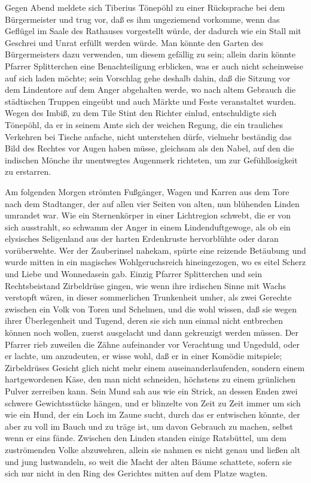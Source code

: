 Gegen Abend meldete sich Tiberius Tönepöhl zu einer Rücksprache bei
dem Bürgermeister und trug vor, daß es ihm ungeziemend vorkomme,
wenn das Geflügel im Saale des Rathauses vorgestellt würde, der
dadurch wie ein Stall mit Geschrei und Unrat erfüllt werden würde.
Man könnte den Garten des Bürgermeisters dazu verwenden, um diesem
gefällig zu sein; allein darin könnte Pfarrer Splitterchen eine
Benachteiligung erblicken, was er auch nicht scheinweise auf sich
laden möchte; sein Vorschlag gehe deshalb dahin, daß die Sitzung
vor dem Lindentore auf dem Anger abgehalten werde, wo nach altem
Gebrauch die städtischen Truppen eingeübt und auch Märkte und Feste
veranstaltet wurden. Wegen des Imbiß, zu dem Tile Stint den Richter
einlud, entschuldigte sich Tönepöhl, da er in seinem Amte sich der
weichen Regung, die ein trauliches Verkehren bei Tische anfache,
nicht unterstehen dürfe, vielmehr beständig das Bild des Rechtes
vor Augen haben müsse, gleichsam als den Nabel, auf den die
indischen Mönche ihr unentwegtes Augenmerk richteten, um zur
Gefühllosigkeit zu erstarren.

Am folgenden Morgen strömten Fußgänger, Wagen und Karren aus dem
Tore nach dem Stadtanger, der auf allen vier Seiten von alten, nun
blühenden Linden umrandet \pagenum{[44]} war. Wie ein Sternenkörper
in einer Lichtregion schwebt, die er von sich ausstrahlt, so
schwamm der Anger in einem Lindenduftgewoge, als ob ein elysisches
Seligenland aus der harten Erdenkruste hervorblühte oder daran
vorüberwehte. Wer der Zauberinsel nahekam, spürte eine reizende
Betäubung und wurde mitten in ein magisches Wohlgeruchsreich
hineingezogen, wo es eitel Scherz und Liebe und Wonnedasein gab.
Einzig Pfarrer Splitterchen und sein Rechtsbeistand Zirbeldrüse
gingen, wie wenn ihre irdischen Sinne mit Wachs verstopft wären, in
dieser sommerlichen Trunkenheit umher, als zwei Gerechte zwischen
ein Volk von Toren und Schelmen, und die wohl wissen, daß sie wegen
ihrer Überlegenheit und Tugend, deren sie sich nun einmal nicht
entbrechen können noch wollen, zuerst ausgelacht und dann
gekreuzigt werden müssen. Der Pfarrer rieb zuweilen die Zähne
aufeinander vor Verachtung und Ungeduld, oder er lachte, um
anzudeuten, er wisse wohl, daß er in einer Komödie mitspiele;
Zirbeldrüses Gesicht glich nicht mehr einem auseinanderlaufenden,
sondern einem hartgewordenen Käse, den man nicht schneiden,
höchstens zu einem grünlichen Pulver zerreiben kann. Sein Mund sah
aus wie ein Strick, an dessen Enden zwei schwere Gewichtsstücke
hängen, und er blinzelte von Zeit zu Zeit immer um sich wie ein
Hund, der ein Loch im Zaune sucht, durch das er entwischen könnte,
der aber zu voll im Bauch und zu träge ist, um davon Gebrauch zu
machen, selbst wenn er eins fände. Zwischen den Linden standen
einige Ratsbüttel, um dem zuströmenden Volke abzuwehren, allein sie
nahmen es nicht genau und ließen alt und jung lustwandeln, so weit
die Macht der alten Bäume schattete, sofern sie sich nur nicht in
den Ring des Gerichtes mitten auf dem Platze wagten.

